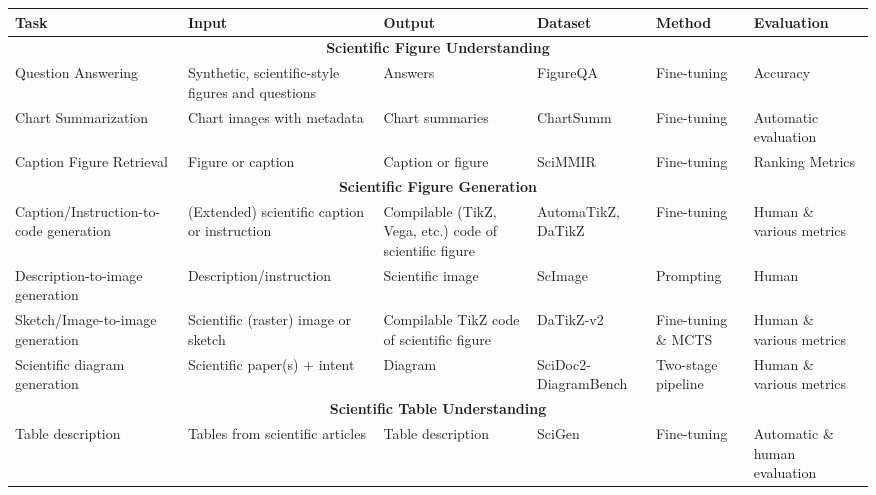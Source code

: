 \begin{table}[t]
\begin{small}
    \begin{tabular}{p{2.5cm}|p{2.5cm}|p{2cm}|p{1.7cm}|p{1.8cm}|p{2cm}}
        \toprule
        \textbf{Task} & \textbf{Input} & \textbf{Output} & \textbf{Dataset} & \textbf{Method} & \textbf{Evaluation} \\
        \midrule  
        \multicolumn{6}{c}{\textbf{Scientific Figure Understanding}} \\ 
        \midrule
        Question Answering \cite{10.1007/978-3-319-46493-0_15} & Synthetic, scientific-style figures and questions & Answers & FigureQA & Fine-tuning & Accuracy \\ 
        Chart Summarization \cite{Rahman2023ChartSummAC} & Chart images with metadata & Chart summaries & ChartSumm & Fine-tuning & Automatic evaluation \\ 
        Caption Figure Retrieval & Figure or caption & Caption or figure & SciMMIR & Fine-tuning & Ranking Metrics \\
        \midrule
        \multicolumn{6}{c}{\textbf{Scientific Figure Generation}} \\ 
        \midrule
        Caption/Instruction-to-code generation \citep{belouadi2024automatikz,voigt2024plots} & (Extended) scientific caption or instruction & Compilable (TikZ, Vega, etc.) code of scientific figure & AutomaTikZ, DaTikZ & Fine-tuning & Human \& various metrics \citep{belouadi2024automatikz} \\
        Description-to-image generation \citep{zhang2024scimagegoodmultimodallarge} & Description/instruction & Scientific image & ScImage & Prompting & Human \\
        Sketch/Image-to-image generation & Scientific (raster) image or sketch & Compilable TikZ code of scientific figure & DaTikZ-v2 & Fine-tuning \& MCTS & Human \& various metrics \\
        Scientific diagram generation \cite{mondal-etal-2024-scidoc2diagrammer} & Scientific paper(s) + intent & Diagram & SciDoc2-DiagramBench & Two-stage pipeline & Human \& various metrics \\ 
        \midrule
        \multicolumn{6}{c}{\textbf{Scientific Table Understanding}} \\ 
        \midrule
        Table description \cite{BENCHMARKS2021_149e9677} & Tables from scientific articles & Table description & SciGen & Fine-tuning & Automatic \& human evaluation \\

\end{tabular}
\end{small}
\end{table}
